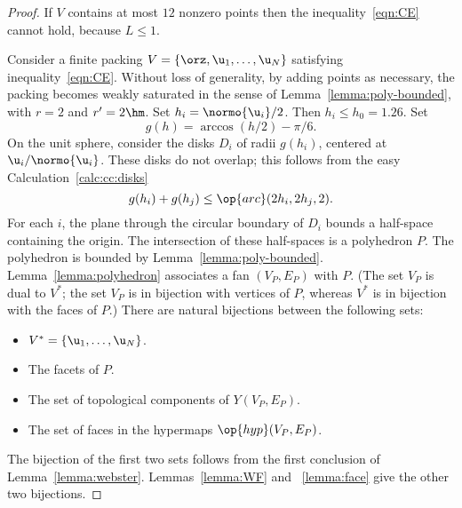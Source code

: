 \begin{proof} If $ V$ contains at most $12$ nonzero points then
the inequality~\ref{eqn:CE} cannot hold, because $L\le 1$.

Consider a finite packing $ V=\{\orz, \u_1,\ldots, \u_N\}$ satisfying
inequality~\ref{eqn:CE}.  Without loss of generality, by adding points
as necessary, the packing becomes weakly saturated in the sense of
Lemma~\ref{lemma:poly-bounded}, with $r=2$ and $r'=2\hm$.  Set $h_i =
\normo{ \u_i}/2$.  Then $h_i\le h_0=1.26$.  Set
\begin{displaymath}%
g(h) = \arccos(h/2) - \pi/6.  %
\end{displaymath}%
On the unit sphere, consider the disks $D_i$ of radii $g(h_i)$,
centered at $ \u_i/\normo{ \u_i}$.  These disks do not overlap; this
follows from the easy
Calculation~\ref{calc:cc:disks} %
\begin{displaymath}%
g(h_i) + g(h_j) \le \op{arc}(2h_i,2h_j,2).%
\end{displaymath}%
%
For each $i$, the plane through the circular boundary of $D_i$ bounds
a half-space containing the origin.  The intersection of these
half-spaces is a polyhedron $P$.  The polyhedron is bounded by
Lemma~\ref{lemma:poly-bounded}.  Lemma~\ref{lemma:polyhedron}
associates a fan $(V_P,E_P)$ with $P$.  (The set $V_P$ is dual to $
V^*$; the set $V_P$ is in bijection with vertices of $P$, whereas $
V^*$ is in bijection with the faces of $P$.)  There are natural
bijections between the following sets:
\begin{itemize}
\item $ V^* = \{ \u_1,\ldots, \u_N\}$.
\item The  facets of $P$.
\item The set of  topological components of $Y(V_P,E_P)$.
\item The set of faces in the hypermaps $\op{hyp}(V_P,E_P)$.
\end{itemize}
The bijection of the first two sets follows from the first conclusion
of Lemma~\ref{lemma:webster}.  Lemmas~\ref{lemma:WF} and
~\ref{lemma:face} give the other two bijections.


\end{proof}
